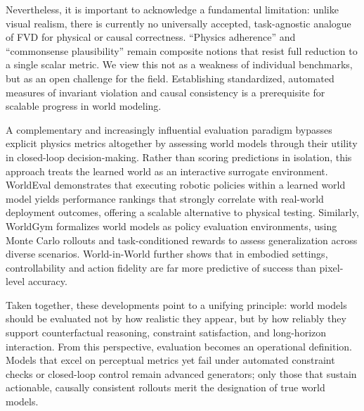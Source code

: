 \documentclass[pdflatex,sn-mathphys-num]{sn-jnl}
\theoremstyle{thmstyleone}%
\theoremstyle{thmstyletwo}%
\theoremstyle{thmstylethree}%
\begin{document}
Nevertheless, it is important to acknowledge a fundamental limitation: unlike visual realism, there is currently no universally accepted, task-agnostic analogue of FVD for physical or causal correctness. “Physics adherence” and “commonsense plausibility” remain composite notions that resist full reduction to a single scalar metric. We view this not as a weakness of individual benchmarks, but as an open challenge for the field. Establishing standardized, automated measures of invariant violation and causal consistency is a prerequisite for scalable progress in world modeling.

A complementary and increasingly influential evaluation paradigm bypasses explicit physics metrics altogether by assessing world models through their utility in closed-loop decision-making. Rather than scoring predictions in isolation, this approach treats the learned world as an interactive surrogate environment. WorldEval \citep{worldeval} demonstrates that executing robotic policies within a learned world model yields performance rankings that strongly correlate with real-world deployment outcomes, offering a scalable alternative to physical testing. Similarly, WorldGym \citep{worldgym} formalizes world models as policy evaluation environments, using Monte Carlo rollouts and task-conditioned rewards to assess generalization across diverse scenarios. World-in-World \citep{worldinworld} further shows that in embodied settings, controllability and action fidelity are far more predictive of success than pixel-level accuracy.

Taken together, these developments point to a unifying principle: world models should be evaluated not by how realistic they appear, but by how reliably they support counterfactual reasoning, constraint satisfaction, and long-horizon interaction. From this perspective, evaluation becomes an operational definition. Models that excel on perceptual metrics yet fail under automated constraint checks or closed-loop control remain advanced generators; only those that sustain actionable, causally consistent rollouts merit the designation of true world models.
\end{document}
